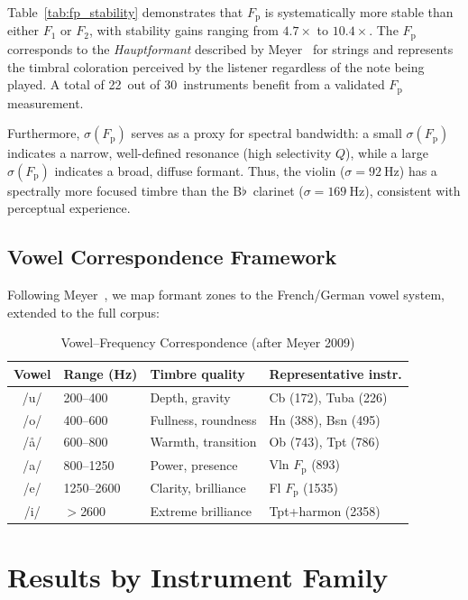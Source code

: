\documentclass[journal]{IEEEtran}
\newcommand{\Fp}{F_\mathrm{p}}
\newcommand{\Fn}[1]{F_{#1}}
\begin{document}
Table~\ref{tab:fp_stability} demonstrates that $\Fp$ is systematically more stable than either $\Fn{1}$ or $\Fn{2}$, with stability gains ranging from $4.7\times$ to $10.4\times$. The $\Fp$ corresponds to the \emph{Hauptformant} described by Meyer~\cite{meyer2009} for strings and represents the timbral coloration perceived by the listener regardless of the note being played. A total of 22~out of 30~instruments benefit from a validated $\Fp$ measurement.

Furthermore, $\sigma(\Fp)$ serves as a proxy for spectral bandwidth: a small $\sigma(\Fp)$ indicates a narrow, well-defined resonance (high selectivity $Q$), while a large $\sigma(\Fp)$ indicates a broad, diffuse formant. Thus, the violin ($\sigma = \SI{92}{\hertz}$) has a spectrally more focused timbre than the B$\flat$~clarinet ($\sigma = \SI{169}{\hertz}$), consistent with perceptual experience.

\subsection{Vowel Correspondence Framework}

Following Meyer~\cite{meyer2009}, we map formant zones to the French/German vowel system, extended to the full corpus:

\begin{table}[!t]
\centering
\caption{Vowel--Frequency Correspondence (after Meyer 2009)}
\label{tab:vowels}
\begin{tabular}{@{}clll@{}}
\toprule
Vowel & Range (Hz) & Timbre quality & Representative instr. \\
\midrule
/u/ & 200--400   & Depth, gravity       & Cb (172), Tuba (226) \\
/o/ & 400--600   & Fullness, roundness  & Hn (388), Bsn (495) \\
/\aa/ & 600--800 & Warmth, transition   & Ob (743), Tpt (786) \\
/a/ & 800--1250  & Power, presence      & Vln $\Fp$ (893) \\
/e/ & 1250--2600 & Clarity, brilliance  & Fl $\Fp$ (1535) \\
/i/ & $>$2600    & Extreme brilliance   & Tpt+harmon (2358) \\
\bottomrule
\end{tabular}
\end{table}

\section{Results by Instrument Family}
\label{sec:results}
\end{document}

